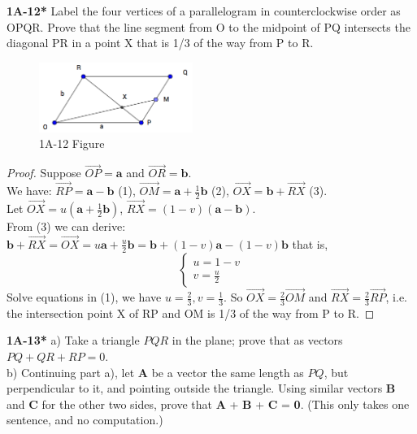\documentclass{article}
\begin{document}
%
%
\textbf{1A-12*} Label the four vertices of a parallelogram in counterclockwise order as OPQR. Prove that the line segment from O to the midpoint of PQ intersects the diagonal PR in a point X that is 1/3 of the way from P to R.
\begin{figure}[htp!]
    \centering
    \includegraphics[width=50mm,scale=0.5]{Figure/1A-12.png}
    \caption{1A-12 Figure}
    \label{1A-12 Figure}
\end{figure}
%
%
\begin{proof}
Suppose $\overrightarrow{OP} = \mathbf{a}$ and $\overrightarrow{OR} = \mathbf{b}$.
\\ We have: $\overrightarrow{RP} = \mathbf{a} - \mathbf{b}$ (1), $\overrightarrow{OM} = \mathbf{a} + \frac{1}{2} \mathbf{b}$ (2), $\overrightarrow{OX} = \mathbf{b} + \overrightarrow{RX}$ (3).
\\Let $\overrightarrow{OX} = u(\mathbf{a} + \frac{1}{2}\mathbf{b})$, $\overrightarrow{RX} = (1 - v)(\mathbf{a} - \mathbf{b})$.
\\ From (3) we can derive:
\\ $\mathbf{b} + \overrightarrow{RX} = \overrightarrow{OX} = u\mathbf{a} + \frac{u}{2}\mathbf{b} = \mathbf{b} + (1-v)\mathbf{a} - (1-v)\mathbf{b}$
that is, 
\begin{equation}
    \begin{cases}
    u = 1 - v
    \\ v = \frac{u}{2}
    \end{cases}
\end{equation}
Solve equations in (1), we have $u = \frac{2}{3}, v = \frac{1}{3}$. So $\overrightarrow{OX} = \frac{2}{3} \overrightarrow{OM}$ and $\overrightarrow{RX} = \frac{2}{3} \overrightarrow{RP}$, i.e. the intersection point X of RP and OM is 1/3 of the way from P to R.
\end{proof}
%
%
\textbf{1A-13*} a) Take a triangle $PQR$ in the plane; prove that as vectors $PQ+QR+RP = 0$.
\\ b) Continuing part a), let \textbf{A} be a vector the same length as $PQ$, but perpendicular to it, and pointing outside the triangle. Using similar vectors \textbf{B} and \textbf{C} for the other two sides, prove that \textbf{A} + \textbf{B} + \textbf{C} = \textbf{0}. (This only takes one sentence, and no computation.)
\end{document}

